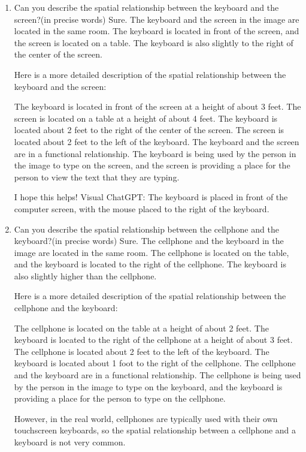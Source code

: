 \begin{enumerate}
    \item Can you describe the spatial relationship between the keyboard and the screen?(in precise words)
    \subitem Sure. The keyboard and the screen in the image are located in the same room. The keyboard is located in front of the screen, and the screen is located on a table. The keyboard is also slightly to the right of the center of the screen.

    Here is a more detailed description of the spatial relationship between the keyboard and the screen:
    
    The keyboard is located in front of the screen at a height of about 3 feet.
    The screen is located on a table at a height of about 4 feet.
    The keyboard is located about 2 feet to the right of the center of the screen.
    The screen is located about 2 feet to the left of the keyboard.
    The keyboard and the screen are in a functional relationship. The keyboard is being used by the person in the image to type on the screen, and the screen is providing a place for the person to view the text that they are typing.
    
    I hope this helps!
    \subitem Visual ChatGPT: The keyboard is placed in front of the computer screen, with the mouse placed to the right of the keyboard.
    \item Can you describe the spatial relationship between the cellphone and the keyboard?(in precise words)
    \subitem 
    Sure. The cellphone and the keyboard in the image are located in the same room. The cellphone is located on the table, and the keyboard is located to the right of the cellphone. The keyboard is also slightly higher than the cellphone.
    
    Here is a more detailed description of the spatial relationship between the cellphone and the keyboard:
    
    The cellphone is located on the table at a height of about 2 feet.
    The keyboard is located to the right of the cellphone at a height of about 3 feet.
    The cellphone is located about 2 feet to the left of the keyboard.
    The keyboard is located about 1 foot to the right of the cellphone.
    The cellphone and the keyboard are in a functional relationship. The cellphone is being used by the person in the image to type on the keyboard, and the keyboard is providing a place for the person to type on the cellphone.
    
    However, in the real world, cellphones are typically used with their own touchscreen keyboards, so the spatial relationship between a cellphone and a keyboard is not very common.
    

\end{enumerate}
